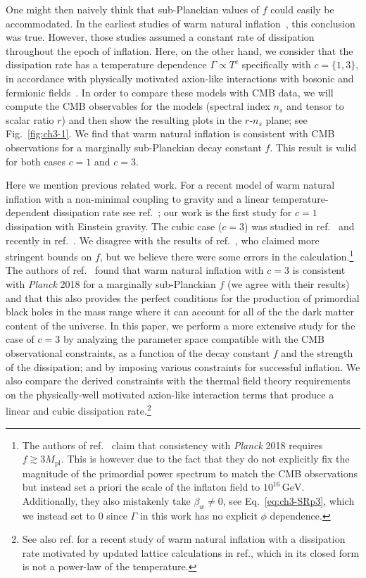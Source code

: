One might then naively think that sub-Planckian values of $f$ could easily be accommodated. In the earliest studies of warm natural inflation~\cite{Visinelli:2011jy}, this conclusion was true. However, those studies assumed a constant rate of dissipation throughout the epoch of inflation. Here, on the other hand, we consider that the dissipation rate has a temperature dependence $\Gamma \propto T^c$ specifically with $c=\{1,3\}$, in accordance with physically motivated axion-like interactions with bosonic and fermionic fields~\cite{Visinelli:2014qla, Visinelli:2016rhn, Berghaus:2019whh, Berghaus:2020ekh, DeRocco:2021rzv}. In order to compare these models with CMB data, we will compute the CMB observables for the models (spectral index $n_s$ and tensor to scalar ratio $r$) and then show the resulting plots in the $r$-$n_s$ plane; see Fig.~\ref{fig:ch3-1}. We find that warm natural inflation is consistent with CMB observations for a marginally sub-Planckian decay constant $f$. This result is valid for both cases $c=1$ and $c=3$.

Here we mention previous related work.
For a recent model of warm natural inflation with a non-minimal coupling to gravity and a linear temperature-dependent dissipation rate see ref.~\cite{AlHallak:2022haa}; our work is the first study for $c=1$ dissipation with Einstein gravity. The cubic case ($c=3$) was studied in ref.~\cite{Reyimuaji:2020bkm} and recently in ref.~\cite{Correa:2022ngq}. We disagree with the results of ref.~\cite{Reyimuaji:2020bkm}, who claimed more stringent bounds on $f$, but we believe there were some errors in the calculation.\footnote{The authors of ref.~\cite{Reyimuaji:2020bkm} claim that consistency with \textit{Planck} 2018 requires $f\gtrsim 3 M_{\mathrm{pl}}$. This is however due to the fact that they do not explicitly fix the magnitude of the primordial power spectrum to match the CMB observations but instead set a priori the scale of the inflaton field to $10^{16}\,\mathrm{GeV}$.
Additionally, they also mistakenly take $\beta_w\neq 0$, see Eq.~\ref{eq:ch3-SRp3}, which we instead set to $0$ since $\Gamma$ in this work has no explicit $\phi$ dependence.} The authors of ref.~\cite{Correa:2022ngq} found that warm natural inflation with $c=3$ is consistent with \textit{Planck} 2018 for a marginally sub-Planckian $f$ (we agree with their results) and that this also provides the perfect conditions for the production of primordial black holes in the mass range where it can account for all of the the dark matter content of the universe. In this paper, we perform a more extensive study for the case of $c=3$ by analyzing the parameter space compatible with the CMB observational constraints, as a function of the decay constant $f$ and the strength of the dissipation; and by imposing various constraints for successful inflation. We also compare the derived constraints with the thermal field theory requirements on the physically-well motivated axion-like interaction terms that produce a linear and cubic dissipation rate.\footnote{See also ref.\cite{Klose:2022rxh} for a recent study of warm natural inflation with a dissipation rate motivated by updated lattice calculations in ref.\cite{Laine:2022ytc}, which in its closed form is not a power-law of the temperature.}

